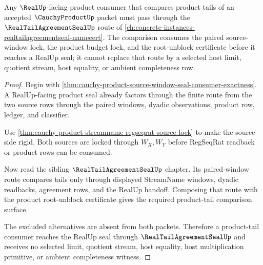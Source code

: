 \begin{theorem}
\label{thm:cauchy-product-realtailagreementseal-handoff}
Any $\RealUp$-facing product consumer that compares product tails of an accepted $\CauchyProductUp$ packet must pass through the $\RealTailAgreementSealUp$ route of \autoref{ch:concrete-instances-realtailagreementseal-namecert}. The comparison consumes the paired source-window lock, the product budget lock, and the root-unblock certificate before it reaches a RealUp seal; it cannot replace that route by a selected host limit, quotient stream, host equality, or ambient completeness row.
\end{theorem}
\begin{proof}
Begin with \autoref{thm:cauchy-product-source-window-seal-consumer-exactness}. A RealUp-facing product seal already factors through the finite route from the two source rows through the paired windows, dyadic observations, product row, ledger, and classifier.

Use \autoref{thm:cauchy-product-streamname-regseqrat-source-lock} to make the source side rigid. Both sources are locked through $W_X,W_Y$ before RegSeqRat readback or product rows can be consumed.

Now read the sibling $\RealTailAgreementSealUp$ chapter. Its paired-window route compares tails only through displayed StreamName windows, dyadic readbacks, agreement rows, and the RealUp handoff. Composing that route with the product root-unblock certificate gives the required product-tail comparison surface.

The excluded alternatives are absent from both packets. Therefore a product-tail consumer reaches the RealUp seal through $\RealTailAgreementSealUp$ and receives no selected limit, quotient stream, host equality, host multiplication primitive, or ambient completeness witness.
\end{proof}

